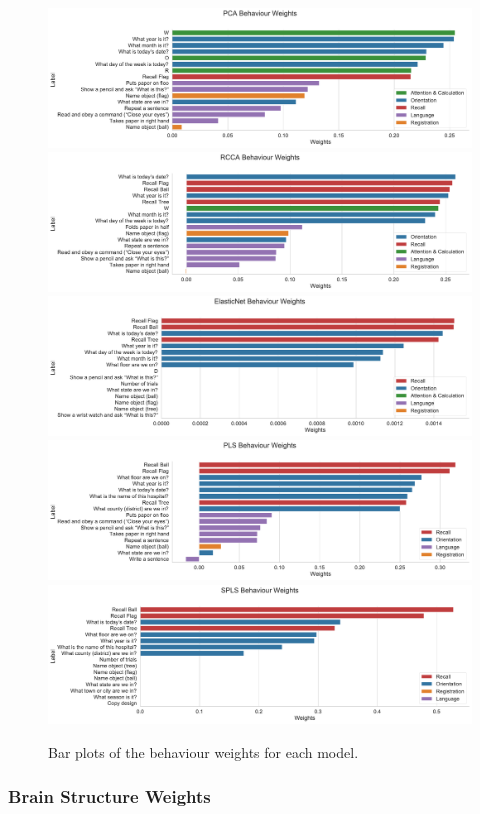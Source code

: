 \begin{figure}
\centering
\includegraphics[width=0.8\linewidth]{figures/adni/PCA behaviour weights}
\includegraphics[width=0.8\linewidth]{figures/adni/RCCA behaviour weights}
\includegraphics[width=0.8\linewidth]{figures/adni/ElasticNet behaviour weights}
\includegraphics[width=0.8\linewidth]{figures/adni/PLS behaviour weights}
\includegraphics[width=0.8\linewidth]{figures/adni/SPLS behaviour weights}
\caption{Bar plots of the behaviour \gls{weights} for each model.}\label{fig:adni-beh}
\end{figure}

\subsubsection{Brain Structure Weights}

